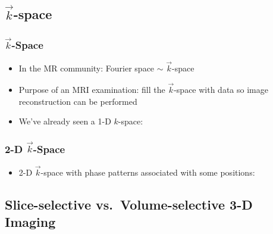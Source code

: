 


\subsection{$\vec k$-space} %
\label{sub:k_space}

\begin{frame}
	\frametitle{$\vec k$-Space}
	
	\begin{itemize}
		\item In the MR community: Fourier space $\sim$ $\vec k$-space
		\item Purpose of an MRI examination: fill the $\vec k$-space with data so image reconstruction can be performed
		\item We've already seen a 1-D $k$-space:
	\end{itemize}
	
	\begin{center}
		
	\end{center}
	
\end{frame}

\begin{frame}
	\frametitle{2-D $\vec k$-Space}
	
	\begin{itemize}
		\item 2-D $\vec k$-space with phase patterns associated with some positions:
	\end{itemize}
	
	\vspace{-2ex}
	
	\begin{center}
		
	\end{center}
\end{frame}




\subsection{Slice-selective vs.~Volume-selective 3-D Imaging} %
\label{sub:slice_selective_vs_volume_selective_3_d_imaging}

